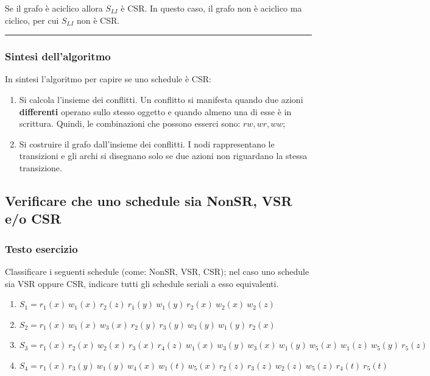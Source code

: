 \documentclass[a4paper]{article}
\newcommand{\longline}{\noindent\rule{\textwidth}{0.4pt}}
\begin{document}
	\noindent
	Se il grafo è aciclico allora $S_{LI}$ è CSR. In questo caso, il grafo non è aciclico ma ciclico, per cui $S_{LI}$ non è CSR.
	
	\longline
	
	\subsubsection{Sintesi dell'algoritmo}
	
	In sintesi l'algoritmo per capire se uno schedule è CSR:
	\begin{enumerate}
		\item Si calcola l'insieme dei conflitti. Un conflitto si manifesta quando due azioni \textbf{differenti} operano sullo stesso oggetto e quando almeno una di esse è in scrittura. Quindi, le combinazioni che possono esserci sono: $rw, wr, ww$;
		
		\item Si costruire il grafo dall'insieme dei conflitti. I nodi rappresentano le transizioni e gli archi si disegnano solo se due azioni non riguardano la stessa transizione.
	\end{enumerate}\newpage
	
	\subsection{Verificare che uno schedule sia NonSR, VSR e/o CSR}
	
	\subsubsection{Testo esercizio}
	
	Classificare i seguenti schedule (come: NonSR, VSR, CSR); nel caso uno schedule sia VSR oppure CSR, indicare tutti gli schedule seriali a esso equivalenti.
	\begin{enumerate}
		\item $S_{1} = r_{1}\left(x\right) \: w_{1}\left(x\right) \: r_{2}\left(z\right) \: r_{1}\left(y\right) \: w_{1}\left(y\right) \: r_{2}\left(x\right) \: w_{2}\left(x\right) \: w_{2}\left(z\right)$
		
		\item $S_{2} = r_{1}\left(x\right) \: w_{1}\left(x\right) \: w_{3}\left(x\right) \: r_{2}\left(y\right) \: r_{3}\left(y\right) \: w_{3}\left(y\right) \: w_{1}\left(y\right) \: r_{2}\left(x\right)$
		
		\item $S_{3} = r_{1}\left(x\right) \: r_{2}\left(x\right) \: w_{2}\left(x\right) \: r_{3}\left(x\right) \: r_{4}\left(z\right) \: w_{1}\left(x\right) \: w_{3}\left(y\right) \: w_{3}\left(x\right) \: w_{1}\left(y\right) \: w_{5}\left(x\right) \: w_{1}\left(z\right) \: w_{5}\left(y\right) \: r_{5}\left(z\right)$
		
		\item $S_{4} = r_{1}\left(x\right) \: r_{3}\left(y\right) \: w_{1}\left(y\right) \: w_{4}\left(x\right) \: w_{1}\left(t\right) \: w_{5}\left(x\right) \: r_{2}\left(z\right) \: r_{3}\left(z\right) \: w_{2}\left(z\right) \: w_{5}\left(z\right) \: r_{4}\left(t\right) \: r_{5}\left(t\right)$
	\end{enumerate}
	
\end{document}
